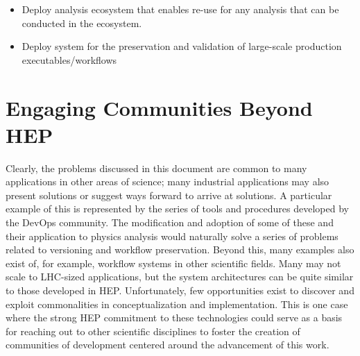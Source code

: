 \documentclass[12pt,a4paper]{article}
\begin{document}
\begin{itemize}
\item
Deploy analysis ecosystem that enables re-use for any analysis that can be conducted in the ecosystem.
\item
Deploy system for the preservation and validation of large-scale production executables/workflows
\end{itemize}

\hypertarget{engage}{%
\section{Engaging Communities Beyond HEP}\label{engage}}
Clearly, the problems discussed in this document are common to many applications in other areas of science; many industrial applications may also present solutions or suggest ways forward to arrive at solutions. A particular example of this is represented by the series of tools and procedures developed by the DevOps community.  The modification and adoption of some of these and their application to physics analysis would naturally solve a series of problems related to versioning and workflow preservation.  Beyond this, many examples also exist of, for example, workflow systems in other scientific fields.  Many may not scale to LHC-sized applications, but the system architectures can be quite similar to those developed in HEP.  Unfortunately, few opportunities exist to discover and exploit commonalities in conceptualization and implementation.  This is one case where the strong HEP commitment to these technologies could serve as a basis for reaching out to other scientific disciplines to foster the creation of communities of development centered around the advancement of this work.



\newpage
\end{document}
